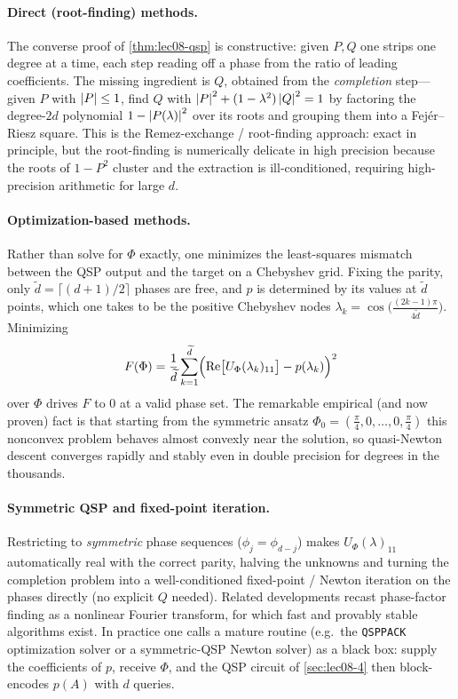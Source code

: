 \paragraph{Direct (root-finding) methods.} The converse proof of
\cref{thm:lec08-qsp} is constructive: given $P,Q$ one strips one degree at a time,
each step reading off a phase from the ratio of leading coefficients. The missing
ingredient is $Q$, obtained from the \emph{completion} step---given $P$ with
$\left\lvert P \right\rvert\le1$, find $Q$ with $\left\lvert P \right\rvert^2+(1-\lambda^2)\left\lvert Q \right\rvert^2=1$ by factoring the
degree-$2d$ polynomial $1-\left\lvert P(\lambda) \right\rvert^2$ over its roots and grouping them into a
Fej\'er--Riesz square. This is the Remez-exchange / root-finding approach: exact in
principle, but the root-finding is numerically delicate in high precision because
the roots of $1-P^2$ cluster and the extraction is ill-conditioned, requiring
high-precision arithmetic for large $d$.

\paragraph{Optimization-based methods.} Rather than solve for $\Phi$ exactly, one
minimizes the least-squares mismatch between the QSP output and the target on a
Chebyshev grid. Fixing the parity, only $\widetilde d=\lceil(d+1)/2\rceil$ phases are
free, and $p$ is determined by its values at $\widetilde d$ points, which one takes
to be the positive Chebyshev nodes $\lambda_k=\cos\!\bigl(\tfrac{(2k-1)\pi}
{4\widetilde d}\bigr)$. Minimizing
\begin{equation}
  F(\Phi)=\frac{1}{\widetilde d}\sum_{k=1}^{\widetilde d}
     \Bigl(\operatorname{Re}\bigl[U_\Phi(\lambda_k)_{11}\bigr]-p(\lambda_k)\Bigr)^2
  \label{eq:lec08-optobj}
\end{equation}
over $\Phi$ drives $F$ to $0$ at a valid phase set. The remarkable empirical (and
now proven) fact is that starting from the symmetric ansatz
$\Phi_0=(\tfrac\pi4,0,\dots,0,\tfrac\pi4)$ this nonconvex problem behaves almost
convexly near the solution, so quasi-Newton descent converges rapidly and stably
even in double precision for degrees in the thousands.

\paragraph{Symmetric QSP and fixed-point iteration.} Restricting to
\emph{symmetric} phase sequences ($\phi_j=\phi_{d-j}$) makes $U_\Phi(\lambda)_{11}$
automatically real with the correct parity, halving the unknowns and turning the
completion problem into a well-conditioned fixed-point / Newton iteration on the
phases directly (no explicit $Q$ needed). Related developments recast phase-factor
finding as a nonlinear Fourier transform, for which fast and provably stable
algorithms exist. In practice one calls a mature routine (e.g.\ the
\texttt{QSPPACK} optimization solver or a symmetric-QSP Newton solver) as a black
box: supply the coefficients of $p$, receive $\Phi$, and the QSP circuit of
\cref{sec:lec08-4} then block-encodes $p(A)$ with $d$ queries.

